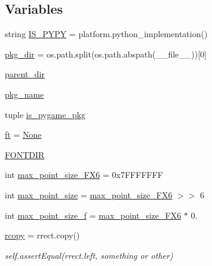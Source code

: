 \subsection*{Variables}
\begin{DoxyCompactItemize}
\item 
string \hyperlink{namespacepygame_1_1tests_1_1freetype__test_a5b2d64acb3dbc8cccf83d1c88f39f640}{I\+S\+\_\+\+P\+Y\+PY} = platform.\+python\+\_\+implementation()
\item 
\hyperlink{namespacepygame_1_1tests_1_1freetype__test_afc05abdba905b5b56988e612a27d2373}{pkg\+\_\+dir} = os.\+path.\+split(os.\+path.\+abspath(\+\_\+\+\_\+file\+\_\+\+\_\+))\mbox{[}0\mbox{]}
\item 
\hyperlink{namespacepygame_1_1tests_1_1freetype__test_a8c1125b579294b9ac681c19ba932dd87}{parent\+\_\+dir}
\item 
\hyperlink{namespacepygame_1_1tests_1_1freetype__test_a90bdf7aee6deeca0fbc69e3db836e50f}{pkg\+\_\+name}
\item 
tuple \hyperlink{namespacepygame_1_1tests_1_1freetype__test_a4840767dba077013b371052b028bd0ff}{is\+\_\+pygame\+\_\+pkg}
\item 
\hyperlink{namespacepygame_1_1tests_1_1freetype__test_a30673dfad73393663cb05f6351cf9ba9}{ft} = \hyperlink{namespacepygame_1_1tests_1_1freetype__test_a68ff732e0bcda8dbe10438d0b43cdcd2}{None}
\item 
\hyperlink{namespacepygame_1_1tests_1_1freetype__test_ac9e375c319f5effa93b928fa60045d59}{F\+O\+N\+T\+D\+IR}
\item 
int \hyperlink{namespacepygame_1_1tests_1_1freetype__test_a2f22d68f40d7b268301119ac03d77873}{max\+\_\+point\+\_\+size\+\_\+\+F\+X6} = 0x7\+F\+F\+F\+F\+F\+FF
\item 
int \hyperlink{namespacepygame_1_1tests_1_1freetype__test_a644bd3bd5aaad01229d6fa5c65e9a494}{max\+\_\+point\+\_\+size} = \hyperlink{namespacepygame_1_1tests_1_1freetype__test_a2f22d68f40d7b268301119ac03d77873}{max\+\_\+point\+\_\+size\+\_\+\+F\+X6} $>$$>$ 6
\item 
int \hyperlink{namespacepygame_1_1tests_1_1freetype__test_aed9bb2ef5372c27e1e690768fe83673e}{max\+\_\+point\+\_\+size\+\_\+f} = \hyperlink{namespacepygame_1_1tests_1_1freetype__test_a2f22d68f40d7b268301119ac03d77873}{max\+\_\+point\+\_\+size\+\_\+\+F\+X6} $\ast$ 0.
\item 
\hyperlink{namespacepygame_1_1tests_1_1freetype__test_a7869143b6a6d82dc2a84cd123c459984}{rcopy} = rrect.\+copy()
\begin{DoxyCompactList}\small\item\em self.\+assert\+Equal(rrect.\+left, something or other) \end{DoxyCompactList}\item 
$$
\end{DoxyCompactItemize}
